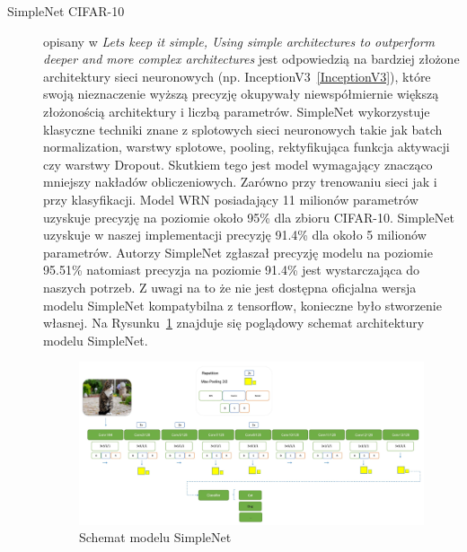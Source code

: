 \documentclass[
    left=2.5cm,         %
    right=2.5cm,        %
    top=2.5cm,          %
    bottom=3cm,         %
    bindingoffset=6mm,  %
    nohyphenation=false %
]{eiti/eiti-thesis}
\begin{document}
\begin{description}
    \item[SimpleNet CIFAR-10]\label{SimpleNetCIFAR-10}
        opisany w
        \textit{Lets keep it simple, Using simple architectures to outperform deeper and more complex architectures}\cite{DBLP:journals/corr/HasanPourRVS16}
        jest odpowiedzią na bardziej złożone
        architektury sieci neuronowych (np. InceptionV3~\ref{InceptionV3}), które swoją nieznaczenie wyższą precyzję
        okupywały niewspółmiernie większą złożonością architektury i liczbą parametrów. SimpleNet wykorzystuje klasyczne
        techniki znane z splotowych sieci neuronowych takie jak batch normalization, warstwy splotowe, pooling,
        rektyfikująca funkcja aktywacji czy warstwy Dropout. Skutkiem tego jest model wymagający znacząco mniejszy nakładów
        obliczeniowych. Zarówno przy trenowaniu sieci jak i przy klasyfikacji. Model WRN\cite{DBLP:journals/corr/ZagoruykoK16}
        posiadający 11 milionów parametrów uzyskuje precyzję na poziomie około 95\% dla zbioru CIFAR-10.
        SimpleNet uzyskuje w naszej implementacji precyzję 91.4\% dla około 5 milionów parametrów.
        Autorzy SimpleNet zgłaszał precyzję modelu na poziomie 95.51\% natomiast precyzja na poziomie 91.4\% jest wystarczająca do naszych potrzeb.
        Z uwagi na to że nie jest dostępna oficjalna wersja modelu SimpleNet kompatybilna z tensorflow, konieczne było stworzenie własnej.
        Na Rysunku~\ref{fig:simplenet_cifar10} znajduje się poglądowy schemat architektury modelu SimpleNet.
        \begin{figure}[H]
            \centring
            \includegraphics[width=\textwidth]{eiti/simplenet_overview.jpg}
            \caption{Schemat modelu SimpleNet\cite{DBLP:journals/corr/HasanPourRVS16}}
            \label{fig:simplenet_cifar10}
        \end{figure}
\end{description}
\end{document}

